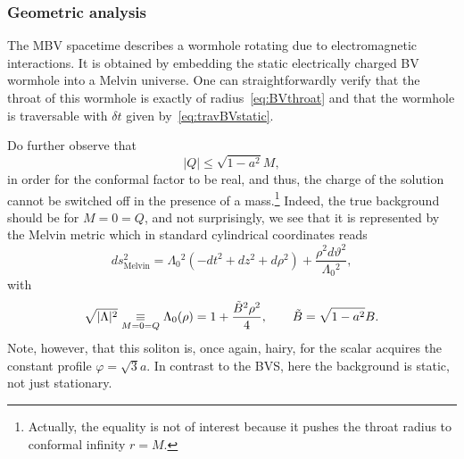 \documentclass[aps,preprint,groupedaddress,nofootinbib,superscriptaddress,showkeys,showpacs,eqsecnum,amsmath,amssymb]{revtex4-1}
\begin{document}
\subsubsection{Geometric analysis}
The MBV spacetime describes a wormhole rotating due to electromagnetic interactions. It is obtained by embedding the static electrically charged BV wormhole into a Melvin universe. One can straightforwardly verify that the throat of this wormhole is exactly of radius~\eqref{eq:BVthroat} and that the wormhole is traversable with $\delta t$ given by~\eqref{eq:travBVstatic}.

Do further observe that 
\begin{equation}
    {|Q|}\leq \sqrt{1-a^2}M,
\end{equation}
in order for the conformal factor to be real, and thus, the charge of the solution cannot be switched off in the presence of a mass.\footnote{Actually, the equality is not of interest because it pushes the throat radius to conformal infinity $r=M$.} Indeed, the true background should be for $M=0=Q$, and not surprisingly, we see that it is represented by the Melvin metric \cite{Ernst:1976mzr} which in standard cylindrical coordinates reads
\begin{equation}
    ds_{\mathrm{Melvin}}^2 = \Lambda_0{}^2 \left(-dt^2 + dz^2 +d\rho^2\right) + \frac{\rho^2 d\vartheta^2}{\Lambda_0{}^2},
\end{equation}
with 
\begin{equation}
    \sqrt{|\Lambda|^2}\underset{M=0=Q}{\equiv}\Lambda_0(\rho)=1+\frac{\Tilde{B}^2 \rho^2}{4},\qquad \Tilde{B} = \sqrt{1-a^2}B. 
\end{equation}
Note, however, that this soliton is, once again, hairy, for the scalar acquires the constant profile $\varphi=\sqrt{3}a$. In contrast to the BVS, here the background is static, not just stationary.
\end{document}
